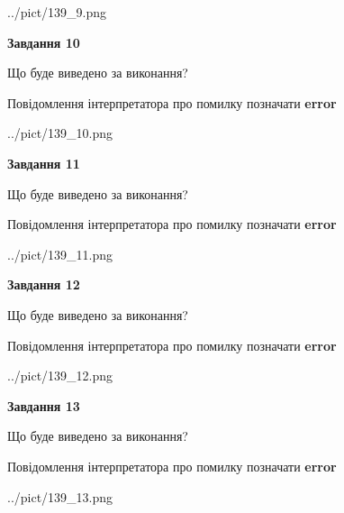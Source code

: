 \documentclass[11pt, ukrainian]{article}
\begin{document}
{\begin {large}
\begin{center}
	{../pict/139_9.png}
\end{center}
\newpage

{\begin {center}\textbf{Завдання 10}\end {center}}\par
Що буде виведено за виконання? \par
Повідомлення інтерпретатора про помилку позначати \textbf{error}

\begin{center}
	{../pict/139_10.png}
\end{center}
\newpage

{\begin {center}\textbf{Завдання 11}\end {center}}\par
Що буде виведено за виконання? \par
Повідомлення інтерпретатора про помилку позначати \textbf{error}

\begin{center}
	{../pict/139_11.png}
\end{center}
\newpage

{\begin {center}\textbf{Завдання 12}\end {center}}\par
Що буде виведено за виконання? \par
Повідомлення інтерпретатора про помилку позначати \textbf{error}

\begin{center}
	{../pict/139_12.png}
\end{center}
\newpage

{\begin {center}\textbf{Завдання 13}\end {center}}\par
Що буде виведено за виконання? \par
Повідомлення інтерпретатора про помилку позначати \textbf{error}

\begin{center}
	{../pict/139_13.png}
\end{center}
\newpage


\end{large}}
\end{document}
